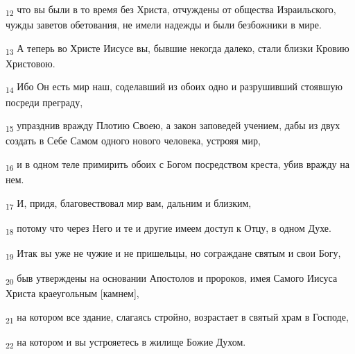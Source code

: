\begin{tcolorbox}
\textsubscript{12} что вы были в то время без Христа, отчуждены от общества Израильского, чужды заветов обетования, не имели надежды и были безбожники в мире.
\end{tcolorbox}
\begin{tcolorbox}
\textsubscript{13} А теперь во Христе Иисусе вы, бывшие некогда далеко, стали близки Кровию Христовою.
\end{tcolorbox}
\begin{tcolorbox}
\textsubscript{14} Ибо Он есть мир наш, соделавший из обоих одно и разрушивший стоявшую посреди преграду,
\end{tcolorbox}
\begin{tcolorbox}
\textsubscript{15} упразднив вражду Плотию Своею, а закон заповедей учением, дабы из двух создать в Себе Самом одного нового человека, устрояя мир,
\end{tcolorbox}
\begin{tcolorbox}
\textsubscript{16} и в одном теле примирить обоих с Богом посредством креста, убив вражду на нем.
\end{tcolorbox}
\begin{tcolorbox}
\textsubscript{17} И, придя, благовествовал мир вам, дальним и близким,
\end{tcolorbox}
\begin{tcolorbox}
\textsubscript{18} потому что через Него и те и другие имеем доступ к Отцу, в одном Духе.
\end{tcolorbox}
\begin{tcolorbox}
\textsubscript{19} Итак вы уже не чужие и не пришельцы, но сограждане святым и свои Богу,
\end{tcolorbox}
\begin{tcolorbox}
\textsubscript{20} быв утверждены на основании Апостолов и пророков, имея Самого Иисуса Христа краеугольным [камнем],
\end{tcolorbox}
\begin{tcolorbox}
\textsubscript{21} на котором все здание, слагаясь стройно, возрастает в святый храм в Господе,
\end{tcolorbox}
\begin{tcolorbox}
\textsubscript{22} на котором и вы устрояетесь в жилище Божие Духом.
\end{tcolorbox}
